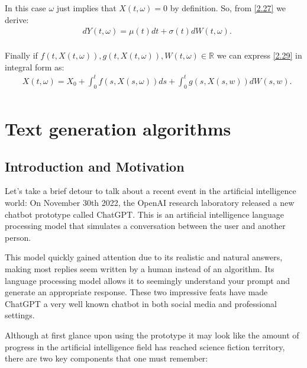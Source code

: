 \documentclass[12pt]{article}
\numberwithin{equation}{section}
\begin{document}
In this case $\omega$ just implies that $X(t, \omega) = 0$ by definition. So, from \ref{2.27} we derive: 
\begin{equation} \label{2.30}
    \begin{split}
           & dY(t, \omega) = \mu(t)dt + \sigma(t)dW(t, \omega). \\
    \end{split}
\end{equation}

Finally if $f(t, X(t, \omega)), g(t, X(t, \omega)), W(t, \omega) \in \mathbb{R}$ we can express \ref{2.29} in integral form \cite{protter2005stochastic} as:
\begin{equation} \label{2.31}
    \begin{split}
           & X(t, \omega) = X_0 + \int^t_0 f(s, X(s, \omega))ds + \int^t_0 g(s, X(s, w))dW(s, w). \\
    \end{split}
\end{equation}

\section{Text generation algorithms}

\subsection{Introduction and Motivation}

Let's take a brief detour to talk about a recent event in the artificial intelligence world: On November 30th 2022, the OpenAI research laboratory released a new chatbot prototype called ChatGPT. This is an artificial intelligence language processing model that simulates a conversation between the user and another person.

This model quickly gained attention due to its realistic and natural answers, making most replies seem written by a human instead of an algorithm. Its language processing model allows it to seemingly understand your prompt and generate an appropriate response. These two impressive feats have made ChatGPT a very well known chatbot in both social media and professional settings.

\bigskip

Although at first glance upon using the prototype it may look like the amount of progress in the artificial intelligence field has reached science fiction territory, there are two key components that one must remember:
\end{document}

